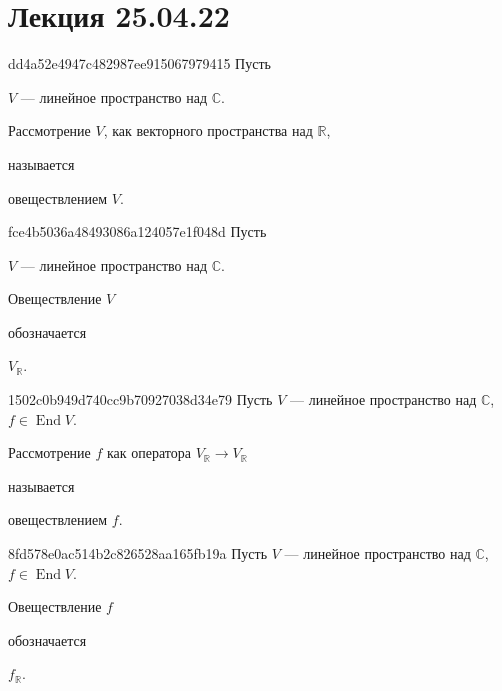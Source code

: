 \section{Лекция 25.04.22}
\begin{note}{dd4a52e4947c482987ee915067979415}
    Пусть \begin{icloze}{3}\({ V }\) --- линейное пространство над \({ \mathbb C }\).\end{icloze}
    \begin{icloze}{1}Рассмотрение \({ V }\), как векторного пространства над \({ \mathbb R }\),\end{icloze} называется \begin{icloze}{2}овеществлением \({ V }\).\end{icloze}
\end{note}

\begin{note}{fce4b5036a48493086a124057e1f048d}
    Пусть \begin{icloze}{3}\({ V }\) --- линейное пространство над \({ \mathbb C }\).\end{icloze}
    \begin{icloze}{1}Овеществление  \({ V }\)\end{icloze} обозначается \begin{icloze}{2}\({ V_{\mathbb R} }\).\end{icloze}
\end{note}

\begin{note}{1502c0b949d740cc9b70927038d34e79}
    Пусть \({ V }\) --- линейное пространство над \({ \mathbb C }\),\: \({ f \in \operatorname{End} V }\).
    \begin{icloze}{1}Рассмотрение \({ f }\) как оператора \({ V_{\mathbb R} \to V_{\mathbb R} }\)\end{icloze} называется \begin{icloze}{2}овеществлением \({ f }\).\end{icloze}
\end{note}

\begin{note}{8fd578e0ac514b2c826528aa165fb19a}
    Пусть \({ V }\) --- линейное пространство над \({ \mathbb C }\),\: \({ f \in \operatorname{End} V }\).
    \begin{icloze}{2}Овеществление \({ f }\)\end{icloze} обозначается \begin{icloze}{1}\({ f_{\mathbb R} }\).\end{icloze}
\end{note}


